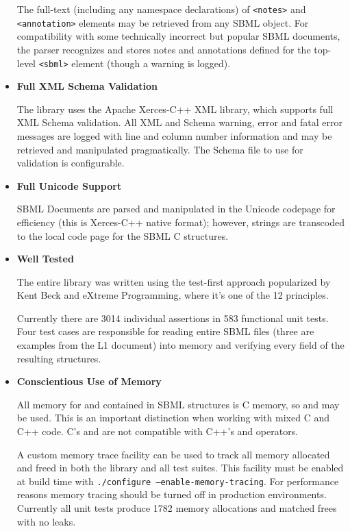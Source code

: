 \documentclass{cekmanual}
\begin{document}
\begin{itemize}
  The full-text (including any namespace declarations) of
  \texttt{<notes>} and \texttt{<annotation>} elements may be retrieved
  from any SBML object.  For compatibility with some technically
  incorrect but popular SBML documents, the parser recognizes and
  stores notes and annotations defined for the top-level
  \texttt{<sbml>} element (though a warning is logged).

  \item \textbf{Full XML Schema Validation}

  The library uses the Apache Xerces-C++ XML library, which supports
  full XML Schema validation.  All XML and Schema warning, error and
  fatal error messages are logged with line and column number
  information and may be retrieved and manipulated pragmatically.  The
  Schema file to use for validation is configurable.

  \item \textbf{Full Unicode Support}

  SBML Documents are parsed and manipulated in the Unicode codepage
  for efficiency (this is Xerces-C++ native format); however, strings
  are transcoded to the local code page for the SBML C structures.

  \item \textbf{Well Tested}

  The entire library was written using the test-first approach
  popularized by Kent Beck and eXtreme Programming, where it's one of
  the 12 principles.

  Currently there are 3014 individual assertions in 583 functional
  unit tests.  Four test cases are responsible for reading entire SBML
  files (three are examples from the L1 document) into memory and
  verifying every field of the resulting structures.

  \item \textbf{Conscientious Use of Memory}

  All memory for and contained in SBML structures is C memory, so
   and  may be used.  This is an
  important distinction when working with mixed C and C++ code.  C's
   and  are not compatible with C++'s
   and  operators.

  A custom memory trace facility can be used to track all memory
  allocated and freed in both the library and all test suites.  This
  facility must be enabled at build time with \texttt{./configure
  --enable-memory-tracing}.  For performance reasons memory tracing
  should be turned off in production environments.  Currently all unit
  tests produce 1782 memory allocations and matched frees with no
  leaks.

\end{itemize}
\end{document}

